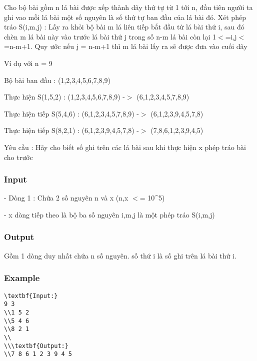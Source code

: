 



   Cho bộ bài gồm n lá bài được xếp thành dãy thứ tự từ 1 tới n, đầu tiên người ta ghi vao mỗi lá bài một số nguyên là số thứ tự ban đầu của lá bài đó. Xét phép tráo S(i,m,j) : Lấy ra khỏi bộ bài m lá liên tiếp bắt đầu từ lá bài thứ i, sau đó chèn m lá bài này vào trước lá bài thứ j trong số n-m lá bài còn lại 1$<$=i,j$<$=n-m+1. Quy ước nếu j = n-m+1 thì m lá bài lấy ra sẽ được đưa vào cuối dãy  

   Ví dụ với n = 9  

   Bộ bài ban đầu : (1,2,3,4,5,6,7,8,9)  

   Thực hiện S(1,5,2) : (1,2,3,4,5,6,7,8,9) -$>$ (6,1,2,3,4,5,7,8,9)  

   Thực hiện tiếp S(5,4,6) : (6,1,2,3,4,5,7,8,9) -$>$ (6,1,2,3,9,4,5,7,8)  

   Thực hiện tiếp S(8,2,1) : (6,1,2,3,9,4,5,7,8) -$>$ (7,8,6,1,2,3,9,4,5)  

   Yêu cầu : Hãy cho biết số ghi trên các lá bài sau khi thực hiện x phép tráo bài cho trước  

\subsubsection{   Input  }

   - Dòng 1 : Chứa 2 số nguyên n và x (n,x $<$= 10\textasciicircum5)  

   - x dòng tiếp theo là bộ ba số nguyên i,m,j là một phép tráo S(i,m,j)  

\subsubsection{   Output  }

   Gồm 1 dòng duy nhất chứa n số nguyên. số thứ i là số ghi trên lá bài thứ i.  

\subsubsection{   Example  }
\begin{verbatim}
\textbf{Input:}
9 3
\\1 5 2
\\5 4 6
\\8 2 1
\\
\\\textbf{Output:}
\\7 8 6 1 2 3 9 4 5 \end{verbatim}